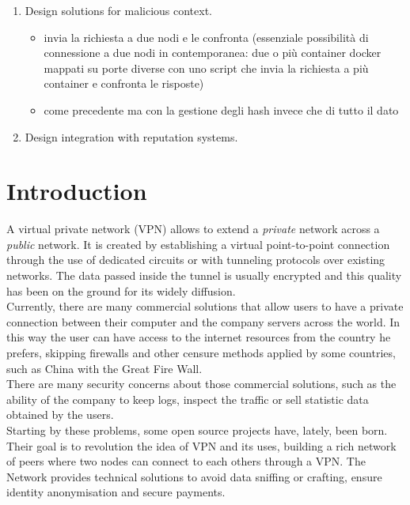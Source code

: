 \documentclass[]{article}
\begin{document}
\begin{enumerate}
\begin{enumerate}
\begin{itemize}
\begin{itemize}
						\end{itemize}
					\end{itemize}	
				\end{enumerate}
			\item Design solutions for malicious context.
				\begin{itemize}
					\item invia la richiesta a due nodi e le confronta (essenziale possibilità di connessione a due nodi in contemporanea: due o più container docker mappati su porte diverse con uno script che invia la richiesta a più container e confronta le risposte)
					\item come precedente ma con la gestione degli hash invece che di tutto il dato
				\end{itemize}
			\item Design integration with reputation systems.
			
	\end{enumerate}
	
	\section{Introduction}
	A virtual private network (VPN) allows to extend a \textit{private} network across a \textit{public} network. It is created by establishing a virtual point-to-point connection through the use of dedicated circuits or with tunneling protocols over existing networks. The data passed inside the tunnel is usually encrypted and this quality has been on the ground for its widely diffusion.\\
	
	Currently, there are many commercial solutions that allow users to have a private connection between their computer and the company servers across the world. In this way the user can have access to the internet resources from the country he prefers, skipping firewalls and other censure methods applied by some countries, such as China with the Great Fire Wall.\\
	There are many security concerns about those commercial solutions, such as the ability of the company to keep logs, inspect the traffic or sell statistic data obtained by the users.\\
	Starting by these problems, some open source projects have, lately, been born. Their goal is to revolution the idea of VPN and its uses, building a rich network of peers where two nodes can connect to each others through a VPN. The Network provides technical solutions to avoid data sniffing or crafting, ensure identity anonymisation and secure payments.\\
	
\end{document}
